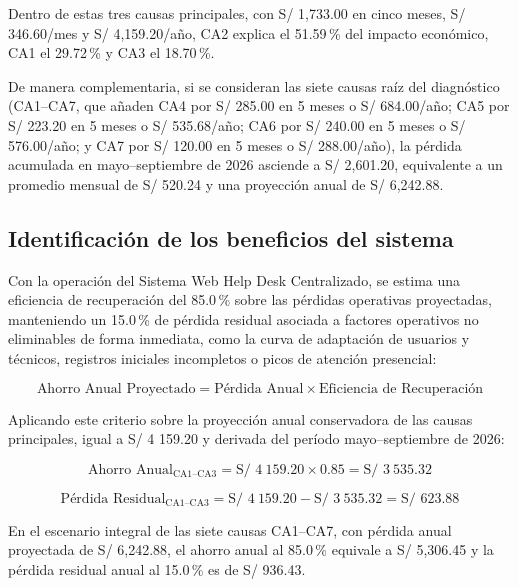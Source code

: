 Dentro de estas tres causas principales, con S/ 1,733.00 en cinco meses, S/ 346.60/mes y S/ 4,159.20/año, CA2 explica el 51.59\,\% del impacto económico, CA1 el 29.72\,\% y CA3 el 18.70\,\%.

De manera complementaria, si se consideran las siete causas raíz del diagnóstico (CA1–CA7, que añaden CA4 por S/ 285.00 en 5 meses o S/ 684.00/año; CA5 por S/ 223.20 en 5 meses o S/ 535.68/año; CA6 por S/ 240.00 en 5 meses o S/ 576.00/año; y CA7 por S/ 120.00 en 5 meses o S/ 288.00/año), la pérdida acumulada en mayo–septiembre de 2026 asciende a S/ 2,601.20, equivalente a un promedio mensual de S/ 520.24 y una proyección anual de S/ 6,242.88.

\subsection{Identificación de los beneficios del sistema}

Con la operación del Sistema Web Help Desk Centralizado, se estima una eficiencia de recuperación del 85.0\,\% sobre las pérdidas operativas proyectadas, manteniendo un 15.0\,\% de pérdida residual asociada a factores operativos no eliminables de forma inmediata, como la curva de adaptación de usuarios y técnicos, registros iniciales incompletos o picos de atención presencial:

\[
\text{Ahorro Anual Proyectado} = \text{Pérdida Anual} \times \text{Eficiencia de Recuperación}
\]

Aplicando este criterio sobre la proyección anual conservadora de las causas principales, igual a S/ 4 159.20 y derivada del período mayo–septiembre de 2026:

\[
\text{Ahorro Anual}_{\text{CA1–CA3}} = \text{S/ } 4\ 159.20 \times 0.85 = \text{S/ } 3\ 535.32
\]

\[
\text{Pérdida Residual}_{\text{CA1–CA3}} = \text{S/ } 4\ 159.20 - \text{S/ } 3\ 535.32 = \text{S/ } 623.88
\]

En el escenario integral de las siete causas CA1–CA7, con pérdida anual proyectada de S/ 6,242.88, el ahorro anual al 85.0\,\% equivale a S/ 5,306.45 y la pérdida residual anual al 15.0\,\% es de S/ 936.43.

